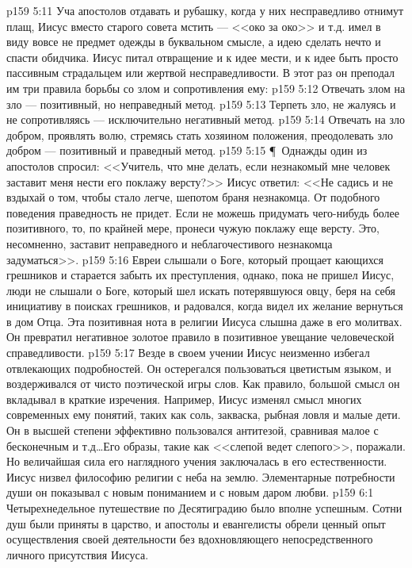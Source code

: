 \vs p159 5:11 Уча апостолов отдавать и рубашку, когда у них несправедливо отнимут плащ, Иисус вместо старого совета мстить --- <<око за око>> и т.д. имел в виду вовсе не предмет одежды в буквальном смысле, а идею сделать нечто  и спасти обидчика. Иисус питал отвращение и к идее мести, и к идее быть просто пассивным страдальцем или жертвой несправедливости. В этот раз он преподал им три правила борьбы со злом и сопротивления ему:
\vs p159 5:12 \bibnobreakspace Отвечать злом на зло --- позитивный, но неправедный метод.
\vs p159 5:13 \bibnobreakspace Терпеть зло, не жалуясь и не сопротивляясь --- исключительно негативный метод.
\vs p159 5:14 \bibnobreakspace Отвечать на зло добром, проявлять волю, стремясь стать хозяином положения, преодолевать зло добром --- позитивный и праведный метод.
\vs p159 5:15 \P\ Однажды один из апостолов спросил: <<Учитель, что мне делать, если незнакомый мне человек заставит меня нести его поклажу версту?>> Иисус ответил: <<Не садись и не вздыхай о том, чтобы стало легче, шепотом браня незнакомца. От подобного поведения праведность не придет. Если не можешь придумать чего\hyp{}нибудь более позитивного, то, по крайней мере, пронеси чужую поклажу еще версту. Это, несомненно, заставит неправедного и неблагочестивого незнакомца задуматься>>.
\vs p159 5:16 Евреи слышали о Боге, который прощает кающихся грешников и старается забыть их преступления, однако, пока не пришел Иисус, люди не слышали о Боге, который шел искать потерявшуюся овцу, беря на себя инициативу в поисках грешников, и радовался, когда видел их желание вернуться в дом Отца. Эта позитивная нота в религии Иисуса слышна даже в его молитвах. Он превратил негативное золотое правило в позитивное увещание человеческой справедливости.
\vs p159 5:17 Везде в своем учении Иисус неизменно избегал отвлекающих подробностей. Он остерегался пользоваться цветистым языком, и воздерживался от чисто поэтической игры слов. Как правило, большой смысл он вкладывал в краткие изречения. Например, Иисус изменял смысл многих современных ему понятий, таких как соль, закваска, рыбная ловля и малые дети. Он в высшей степени эффективно пользовался антитезой, сравнивая малое с бесконечным и т.д\ldots  Его образы, такие как <<слепой ведет слепого>>, поражали. Но величайшая сила его наглядного учения заключалась в его естественности. Иисус низвел философию религии с неба на землю. Элементарные потребности души он показывал с новым пониманием и с новым даром любви.
\vs p159 6:1 Четырехнедельное путешествие по Десятиградию было вполне успешным. Сотни душ были приняты в царство, и апостолы и евангелисты обрели ценный опыт осуществления своей деятельности без вдохновляющего непосредственного личного присутствия Иисуса.
